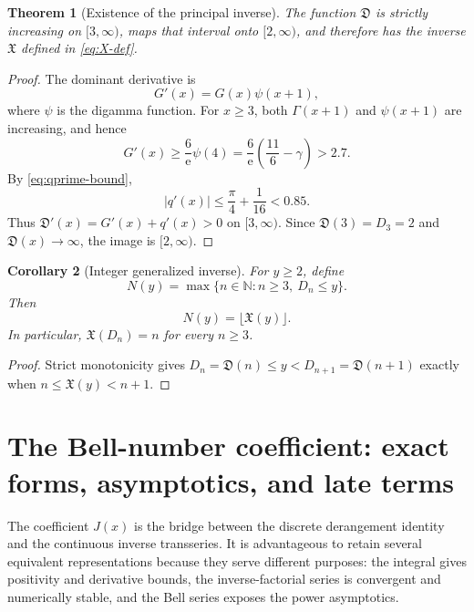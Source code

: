 \documentclass[11pt,oneside]{article}
\theoremstyle{plain}
\newtheorem{theorem}{Theorem}[section]
\newtheorem{corollary}[theorem]{Corollary}
\theoremstyle{definition}
\theoremstyle{remark}
\newcommand{\ee}{\mathrm{e}}
\newcommand{\N}{\mathbb{N}}
\newcommand{\Dfrak}{\mathfrak{D}}
\newcommand{\Xfrak}{\mathfrak{X}}
\newcommand{\abs}[1]{\left\lvert#1\right\rvert}
\begin{document}
\begin{theorem}[Existence of the principal inverse]
\label{thm:monotonicity}
The function \(\Dfrak\) is strictly increasing on \([3,\infty)\), maps that
interval onto \([2,\infty)\), and therefore has the inverse \(\Xfrak\) defined
in \eqref{eq:X-def}.
\end{theorem}
\begin{proof}
The dominant derivative is
\begin{equation}
 G'(x)=G(x)\psi(x+1),
 \label{eq:Gprime-digamma}
\end{equation}
where \(\psi\) is the digamma function.  For \(x\ge3\), both
\(\Gamma(x+1)\) and \(\psi(x+1)\) are increasing, and hence
\[
 G'(x)\ge\frac{6}{\ee}\psi(4)
 =\frac{6}{\ee}\left(\frac{11}{6}-\gamma\right)>2.7.
\]
By \eqref{eq:qprime-bound},
\[
 \abs{q'(x)}\le\frac\pi4+\frac1{16}<0.85.
\]
Thus \(\Dfrak'(x)=G'(x)+q'(x)>0\) on \([3,\infty)\).  Since
\(\Dfrak(3)=D_3=2\) and \(\Dfrak(x)\to\infty\), the image is
\([2,\infty)\).
\end{proof}

\begin{corollary}[Integer generalized inverse]
\label{cor:integer-inverse}
For \(y\ge2\), define
\begin{equation}
 N(y)=\max\{n\in\N:n\ge3,\ D_n\le y\}.
 \label{eq:integer-generalized-inverse}
\end{equation}
Then
\begin{equation}
 \boxed{\quad N(y)=\lfloor\Xfrak(y)\rfloor.\quad}
 \label{eq:floor-inverse}
\end{equation}
In particular, \(\Xfrak(D_n)=n\) for every \(n\ge3\).
\end{corollary}
\begin{proof}
Strict monotonicity gives
\(D_n=\Dfrak(n)\le y<D_{n+1}=\Dfrak(n+1)\) exactly when
\(n\le\Xfrak(y)<n+1\).
\end{proof}

\section{The Bell-number coefficient: exact forms, asymptotics, and late terms}
\label{sec:Bell-tail}

The coefficient \(J(x)\) is the bridge between the discrete derangement
identity and the continuous inverse transseries.  It is advantageous to retain
several equivalent representations because they serve different purposes:
the integral gives positivity and derivative bounds, the inverse-factorial
series is convergent and numerically stable, and the Bell series exposes the
power asymptotics.
\end{document}
